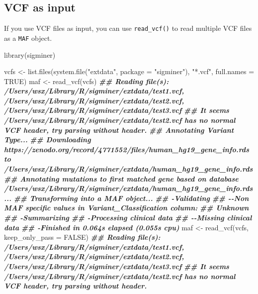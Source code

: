 \documentclass[
  12pt,
  a4paper,
  twoside]{book}
\newenvironment{Shaded}{\begin{snugshade}}{\end{snugshade}}
\newcommand{\AttributeTok}[1]{\textcolor[rgb]{0.77,0.63,0.00}{#1}}
\newcommand{\ConstantTok}[1]{\textcolor[rgb]{0.00,0.00,0.00}{#1}}
\newcommand{\DocumentationTok}[1]{\textcolor[rgb]{0.56,0.35,0.01}{\textbf{\textit{#1}}}}
\newcommand{\FunctionTok}[1]{\textcolor[rgb]{0.00,0.00,0.00}{#1}}
\newcommand{\NormalTok}[1]{#1}
\newcommand{\OtherTok}[1]{\textcolor[rgb]{0.56,0.35,0.01}{#1}}
\newcommand{\StringTok}[1]{\textcolor[rgb]{0.31,0.60,0.02}{#1}}
\begin{document}
\hypertarget{vcf-as-input}{%
\subsection{VCF as input}\label{vcf-as-input}}

If you use VCF files as input, you can use \texttt{read\_vcf()} to read multiple VCF files as a \texttt{MAF} object.

\begin{Shaded}
\begin{Highlighting}[]
\FunctionTok{library}\NormalTok{(sigminer)}

\NormalTok{vcfs }\OtherTok{\textless{}{-}} \FunctionTok{list.files}\NormalTok{(}\FunctionTok{system.file}\NormalTok{(}\StringTok{"extdata"}\NormalTok{, }\AttributeTok{package =} \StringTok{"sigminer"}\NormalTok{), }\StringTok{"*.vcf"}\NormalTok{, }\AttributeTok{full.names =} \ConstantTok{TRUE}\NormalTok{)}
\NormalTok{maf }\OtherTok{\textless{}{-}} \FunctionTok{read\_vcf}\NormalTok{(vcfs)}
\DocumentationTok{\#\# Reading file(s): /Users/wsx/Library/R/sigminer/extdata/test1.vcf, /Users/wsx/Library/R/sigminer/extdata/test2.vcf, /Users/wsx/Library/R/sigminer/extdata/test3.vcf}
\DocumentationTok{\#\# It seems /Users/wsx/Library/R/sigminer/extdata/test2.vcf has no normal VCF header, try parsing without header.}
\DocumentationTok{\#\# Annotating Variant Type...}
\DocumentationTok{\#\# Downloading https://zenodo.org/record/4771552/files/human\_hg19\_gene\_info.rds to /Users/wsx/Library/R/sigminer/extdata/human\_hg19\_gene\_info.rds}
\DocumentationTok{\#\# Annotating mutations to first matched gene based on database /Users/wsx/Library/R/sigminer/extdata/human\_hg19\_gene\_info.rds...}
\DocumentationTok{\#\# Transforming into a MAF object...}
\DocumentationTok{\#\# {-}Validating}
\DocumentationTok{\#\# {-}{-}Non MAF specific values in Variant\_Classification column:}
\DocumentationTok{\#\#   Unknown}
\DocumentationTok{\#\# {-}Summarizing}
\DocumentationTok{\#\# {-}Processing clinical data}
\DocumentationTok{\#\# {-}{-}Missing clinical data}
\DocumentationTok{\#\# {-}Finished in 0.064s elapsed (0.055s cpu)}
\NormalTok{maf }\OtherTok{\textless{}{-}} \FunctionTok{read\_vcf}\NormalTok{(vcfs, }\AttributeTok{keep\_only\_pass =} \ConstantTok{FALSE}\NormalTok{)}
\DocumentationTok{\#\# Reading file(s): /Users/wsx/Library/R/sigminer/extdata/test1.vcf, /Users/wsx/Library/R/sigminer/extdata/test2.vcf, /Users/wsx/Library/R/sigminer/extdata/test3.vcf}
\DocumentationTok{\#\# It seems /Users/wsx/Library/R/sigminer/extdata/test2.vcf has no normal VCF header, try parsing without header.}

\end{Highlighting}
\end{Shaded}
\end{document}
